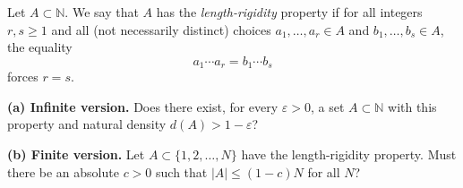 Let $A\subset \mathbb{N}$. We say that $A$ has the \emph{length-rigidity} property if for all integers $r,s\ge 1$ and all (not necessarily distinct) choices $a_1,\dots,a_r\in A$ and $b_1,\dots,b_s\in A$, the equality
\[
 a_1\cdots a_r=b_1\cdots b_s
\]
forces $r=s$.

\medskip
\noindent\textbf{(a) Infinite version.} Does there exist, for every $\varepsilon>0$, a set $A\subset\mathbb{N}$ with this property and natural density $d(A)>1-\varepsilon$?

\medskip
\noindent\textbf{(b) Finite version.} Let $A\subset\{1,2,\dots,N\}$ have the length-rigidity property. Must there be an absolute $c>0$ such that $|A|\le (1-c)N$ for all $N$?
